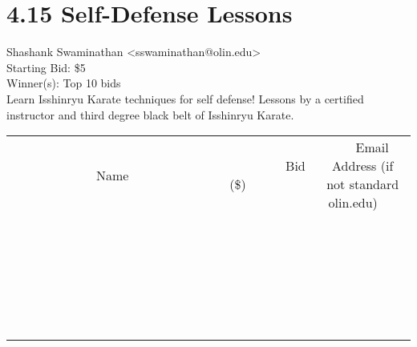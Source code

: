 \documentclass[11pt]{article}
\begin{document}
					\section*{4.15 Self-Defense Lessons}
					Shashank Swaminathan <sswaminathan@olin.edu> \\
					Starting Bid: \$5 \\
					Winner(s): Top 10 bids \\
					Learn Isshinryu Karate techniques for self defense! Lessons by a certified instructor and third degree black belt of Isshinryu Karate. \\
					[6ex]
					\begin{tabular}{c c c}
						~~~~~~~~~~~~~Name~~~~~~~~~~~~~ & ~~~~~~~~~Bid (\$)~~~~~~~~~ & ~~~Email Address (if not standard olin.edu)~~~ \\
				
 & & \\
\hline
 & & \\
\hline
 & & \\
\hline
 & & \\
\hline
 & & \\
\hline
 & & \\
\hline
 & & \\
\hline
 & & \\
\hline
 & & \\
\hline
 & & \\
\hline
 & & \\
\hline
 & & \\
\hline
 & & \\
\hline
 & & \\
\hline
 & & \\
\hline
 & & \\
\hline
 & & \\
\hline
 & & \\
\hline
 & & \\
\hline
 & & \\
\hline
 & & \\
\hline
 & & \\
\hline
 & & \\
\hline
 & & \\
\hline
 & & \\
\hline
 & & \\
\hline
					\end{tabular}
					\clearpage
				
\end{document}
